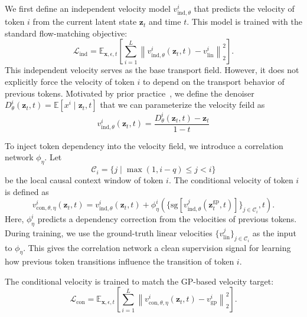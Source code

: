 \documentclass{article} %
\begin{document}
We first define an independent velocity model $v_{\text{ind},\theta}^{i}$ that predicts the velocity of token $i$ from the current latent state $\mathbf{z}_t$ and time $t$. 
This model is trained with the standard flow-matching objective:
\begin{equation}
    \mathcal{L}_{\text{ind}}
    =
    \mathbb{E}_{\mathbf{x},\epsilon,t}
    \left[
        \sum_{i=1}^{L}
        \left\|
            v_{\text{ind},\theta}^{i}(\mathbf{z}_t,t)
            -
            v_{\text{lin}}^{i}
        \right\|_2^2
    \right].
\end{equation}
This independent velocity serves as the base transport field. 
However, it does not explicitly force the velocity of token $i$ to depend on the transport behavior of previous tokens.  Motivated by prior practice~\cite{li2026basicsletdenoisinggenerative}, we define the denoiser $D^i_{\theta}(\mathbf{z}_t, t) = \mathbb{E}[x^i \mid \mathbf{z}_t, t]$ that we can parameterize the velocity feild as 
\begin{equation}
    v^i_{\text{ind}, \theta}(\mathbf{z}_t, t) = \frac{D^i_{\theta}(\mathbf{z}_t, t) - \mathbf{z}_t}{1-t}
\end{equation}

To inject token dependency into the velocity field, we introduce a correlation network $\phi_\eta$. 
Let
\begin{equation}
    \mathcal{C}_i = \{j \mid \max(1,i-q) \leq j < i\}
\end{equation}
be the local causal context window of token $i$. 
The conditional velocity of token $i$ is defined as
\begin{equation}
    v_{\text{con},\theta,\eta}^{i}(\mathbf{z}_t,t)
    =
    v_{\text{ind},\theta}^{i}(\mathbf{z}_t,t)
    +
    \phi_\eta^{i}
    \left(
        \{\mathrm{sg}
        \left[
            v^j_{\mathrm{ind},\theta}(\mathbf{z}^{\mathrm{gp}}_t,t)
        \right]\}_{j \in \mathcal{C}_i}, t
    \right).
    \label{eq:training_cond_velocity}
\end{equation}
Here, $\phi_\eta^{i}$ predicts a dependency correction from the velocities of previous tokens. 
During training, we use the ground-truth linear velocities $\{v_{\text{lin}}^{j}\}_{j \in \mathcal{C}_i}$ as the input to $\phi_\eta$. 
This gives the correlation network a clean supervision signal for learning how previous token transitions influence the transition of token $i$.

The conditional velocity is trained to match the GP-based velocity target:
\begin{equation}
    \mathcal{L}_{\text{con}}
    =
    \mathbb{E}_{\mathbf{x},\epsilon,t}
    \left[
        \sum_{i=1}^{L}
        \left\|
            v_{\text{con},\theta,\eta}^{i}(\mathbf{z}_t,t)
            -
            v_{\text{gp}}^{i}
        \right\|_2^2
    \right].
    \label{eq:conditional_velocity_loss}
\end{equation}
\end{document}
